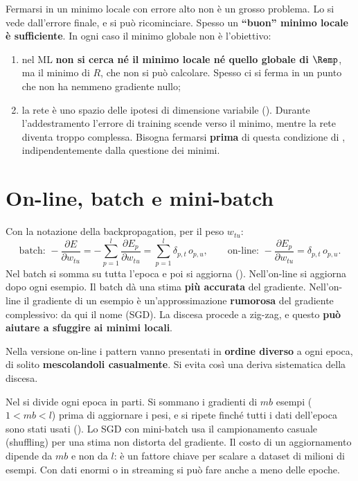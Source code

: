 Fermarsi in un minimo locale con errore alto non è un grosso problema. Lo si vede dall'errore finale, e si può
ricominciare. Spesso un \textbf{``buon'' minimo locale è sufficiente}. In ogni caso il minimo globale non è
l'obiettivo:
\begin{enumerate}
  \item nel ML \textbf{non si cerca né il minimo locale né quello globale di $\Remp$}, ma il minimo di $R$, che
        non si può calcolare. Spesso ci si ferma in un punto che non ha nemmeno gradiente nullo;
  \item la rete è uno spazio delle ipotesi di dimensione variabile (). Durante l'addestramento
        l'errore di training scende verso il minimo, mentre la rete diventa troppo complessa. Bisogna fermarsi
        \textbf{prima} di questa condizione di , indipendentemente dalla questione dei minimi.
\end{enumerate}

\section{On-line, batch e mini-batch}
\label{sec:minibatch}

Con la notazione della backpropagation, per il peso $w_{tu}$:
\[
\text{batch: } -\frac{\partial E}{\partial w_{tu}} = -\sum_{p=1}^{l}\frac{\partial E_p}{\partial w_{tu}} = \sum_{p=1}^{l}\delta_{p,t}\,o_{p,u},
\qquad
\text{on-line: } -\frac{\partial E_p}{\partial w_{tu}} = \delta_{p,t}\,o_{p,u}.
\]
Nel batch si somma su tutta l'epoca e poi si aggiorna (). Nell'on-line si aggiorna dopo ogni
esempio. Il batch dà una stima \textbf{più accurata} del gradiente. Nell'on-line il gradiente di un esempio è
un'approssimazione \textbf{rumorosa} del gradiente complessivo: da qui il nome  (SGD). La discesa procede a zig-zag, e questo \textbf{può aiutare a sfuggire ai minimi locali}.

\begin{idea}[(!) Shuffling]
Nella versione on-line i pattern vanno presentati in \textbf{ordine diverso} a ogni epoca, di solito
\textbf{mescolandoli casualmente}. Si evita così una deriva sistematica della discesa.
\end{idea}

Nel  si divide ogni epoca in parti. Si sommano i gradienti di $mb$ esempi ($1<mb<l$) prima di
aggiornare i pesi, e si ripete finché tutti i dati dell'epoca sono stati usati (). Lo SGD
con mini-batch usa il campionamento casuale (shuffling) per una stima non distorta del gradiente. Il costo di un
aggiornamento dipende da $mb$ e non da $l$: è un fattore chiave per scalare a dataset di milioni di esempi. Con
dati enormi o in streaming si può fare anche a meno delle epoche.

